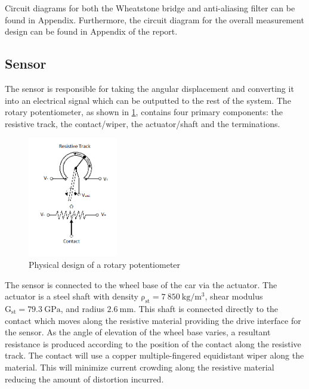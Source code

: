 \documentclass[10pt,twocolumn]{witseiepaper}
\begin{document}
Circuit diagrams for both the Wheatstone bridge and anti-aliasing filter can be found in Appendix. Furthermore, the circuit diagram for the overall measurement design can be found in Appendix of the report.

\subsection{Sensor}

The sensor is responsible for taking the angular displacement and converting it into an electrical signal which can be outputted to the rest of the system. The rotary potentiometer, as shown in \cref{fig:pot}, contains four primary components: the resistive track, the contact/wiper, the actuator/shaft and the terminations.

\begin{figure}[h!]
	\centering
	\includegraphics[width=0.35\textwidth]{Pot2.png}
	\caption{Physical design of a rotary potentiometer}
	\label{fig:pot}
\end{figure}

The sensor is connected to the wheel base of the car via the actuator. The actuator is a steel shaft with density $\mathrm{\rho_{st}} =  7~850~\mathrm{kg/m^3}$, shear modulus $\mathrm{G_{st}} = 79.3~\mathrm{GPa}$, and radius $2.6~\mathrm{mm} $. This shaft is connected directly to the contact which moves along the resistive material providing the drive interface for the sensor. As the angle of elevation of the wheel base varies, a resultant resistance is produced according to the position of the contact along the resistive track. The contact will use a copper multiple-fingered equidistant wiper along the material. This will minimize current crowding along the resistive material reducing the amount of distortion incurred\cite{handbook}.
\end{document}
